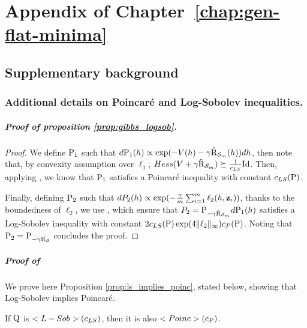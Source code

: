 \chapter{Appendix of Chapter~\ref{chap:gen-flat-minima}}
\label{ap: genflat-minima}

\begin{noaddcontents}
    \section{Supplementary background}
    \label{sec: supp_background}
    \subsection{Additional details on Poincaré and Log-Sobolev inequalities.}
    \paragraph{Proof of proposition \ref{prop:gibbs_logsob}.}
    
    \begin{proof}
        We define $\P_1$ such that $d\P_1(h)\propto \exp(-V(h) - \gamma \hat{\Risk}_{\S_m}(h))dh$, then note that, by convexity assumption over $\ell_1$, $Hess(V+\gamma\hat{\Risk}_{\S_m}) \succeq \frac{1}{c_{LS}}\mathrm{Id}$. Then, applying \citet[Corollary 2.1]{chafai2004entropies}, we know that $\P_1$ satisfies a Poincaré inequality with constant $c_{LS}(\P)$. 
      
        Finally, defining $\P_2$ such that $dP_2(h) \propto \exp(-\frac{\gamma}{m}\sum_{i=1}^m \ell_2(h,\z_i))$, thanks to the boundedness of $\ell_2$, we use \citet[Property 2.6]{guionnet2003lectures}, which ensure that $P_2 = \P_{-\gamma \hat{\Risk}_{\S_m}}d \P_1(h)$ satisfies a Log-Sobolev inequality with constant $2c_{LS}(\P)\exp(4\|\ell_2\|_{\infty}) c_P(\P)$.
        Noting that $\P_2=\P_{-\gamma\hat{\Risk_\S}}$ concludes the proof.
      \end{proof}
    
    
    \paragraph{Proof of \citet[Propsition 2.1]{ledoux2006concentration}}
        We prove here Proposition \ref{prop:ls_implies_poinc}, stated below, showing that Log-Sobolev implies Poincaré.
     \begin{proposition}
        \label{prop:ls_implies_poinc}
        If $\Q$ is $\Lsob(c_{LS})$, then it is also $\Poinc(c_P)$. 
        

\end{proposition}
\end{noaddcontents}
